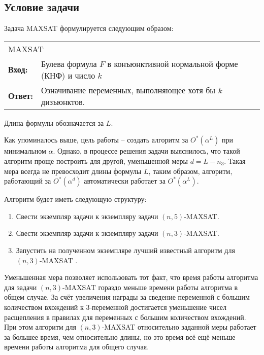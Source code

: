 \subsection*{Условие задачи}

\firstpar{}Задача MAXSAT формулируется следующим образом:

\begin{center}
 \begin{tabular}{|lp{}|}
  \hline
  \multicolumn{2}{|l|}{MAXSAT} \\
  \textbf{Вход:} & Булева формула $F$ в конъюнктивной нормальной форме (КНФ) и число $k$ \\
  \textbf{Ответ:} & Означивание переменных, выполняющее хотя бы $k$ дизъюнктов. \\
  \hline
 \end{tabular}
\end{center}

Длина формулы обозначается за $L$.

Как упоминалось выше, цель работы -- создать алгоритм за $O^*(\alpha^L)$ при минимальном $\alpha$. Однако, в процессе решения задачи выяснилось, что такой алгоритм проще построить для другой, уменьшенной меры $d = L - n_3$. Такая мера всегда не превосходит длины формулы $L$, таким образом, алгоритм, работающий за $O^*(\alpha^d)$ автоматически работает за $O^*(\alpha^L)$.

Алгоритм будет иметь следующую структуру:

\begin{enumerate}
 \item Свести экземпляр задачи к экземпляру задачи $(n,5)$-MAXSAT.
 
 \item Свести экземпляр задачи к экземпляру задачи $(n,3)$-MAXSAT.

 \item Запустить на полученном экземпляре лучший известный алгоритм для $(n,3)$-MAXSAT \cite{belova18}.
\end{enumerate}

Уменьшенная мера позволяет использовать тот факт, что время работы алгоритма для задачи $(n,3)$-MAXSAT гораздо меньше времени работы алгоритма в общем случае. За счёт увеличения награды за сведение переменной с большим количеством вхождений к 3-переменной достигается уменьшение чисел расщепления в правилах для переменных с большим количеством вхождений. При этом алгоритм для $(n,3)$-MAXSAT относительно заданной меры работает за большее время, чем относительно длины, но это время всё ещё меньше времени работы алгоритма для общего случая.

